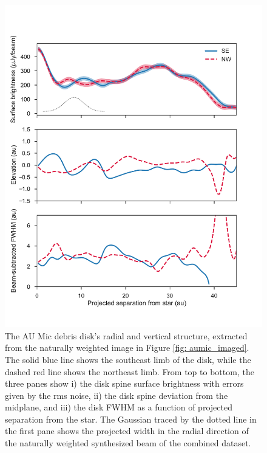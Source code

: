 \documentclass[modern]{aastex62}
\begin{document}
\begin{figure}
  \centering
  \includegraphics[width=.75\linewidth]{../figures/boccaletti_plots}
  \caption{
  The AU Mic debris disk's radial and vertical structure, extracted from the naturally weighted image in Figure \ref{fig: aumic_imaged}. 
  The solid blue line shows the southeast limb of the disk, while the dashed red line shows the northeast limb.
  From top to bottom, the three panes show i) the disk spine surface brightness with errors given by the rms noise, ii) the disk spine deviation from the midplane, and iii) the disk FWHM as a function of projected separation from the star. 
  The Gaussian traced by the dotted line in the first pane shows the projected width in the radial direction of the naturally weighted synthesized beam of the combined dataset.
}
\end{figure}
\end{document}

